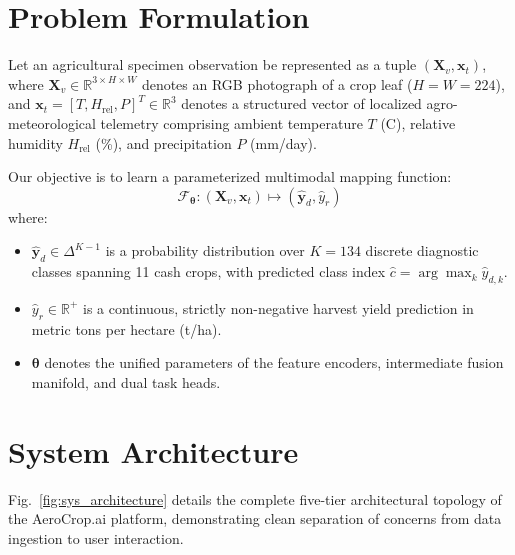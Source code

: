 \documentclass[conference]{IEEEtran}
\begin{document}
\section{Problem Formulation}

Let an agricultural specimen observation be represented as a tuple $(\mathbf{X}_v, \mathbf{x}_t)$, where $\mathbf{X}_v \in \mathbb{R}^{3 \times H \times W}$ denotes an RGB photograph of a crop leaf ($H = W = 224$), and $\mathbf{x}_t = [T, H_{\text{rel}}, P]^T \in \mathbb{R}^3$ denotes a structured vector of localized agro-meteorological telemetry comprising ambient temperature $T$ (\textdegree C), relative humidity $H_{\text{rel}}$ (\%), and precipitation $P$ (mm/day).

Our objective is to learn a parameterized multimodal mapping function:
\begin{equation}
    \mathcal{F}_{\boldsymbol{\theta}}: (\mathbf{X}_v, \mathbf{x}_t) \mapsto (\hat{\mathbf{y}}_d, \hat{y}_r)
\end{equation}
where:
\begin{itemize}
    \item $\hat{\mathbf{y}}_d \in \Delta^{K-1}$ is a probability distribution over $K = 134$ discrete diagnostic classes spanning 11 cash crops, with predicted class index $\hat{c} = \arg\max_k \hat{y}_{d,k}$.
    \item $\hat{y}_r \in \mathbb{R}^+$ is a continuous, strictly non-negative harvest yield prediction in metric tons per hectare (t/ha).
    \item $\boldsymbol{\theta}$ denotes the unified parameters of the feature encoders, intermediate fusion manifold, and dual task heads.
\end{itemize}

\section{System Architecture}

Fig.~\ref{fig:sys_architecture} details the complete five-tier architectural topology of the AeroCrop.ai platform, demonstrating clean separation of concerns from data ingestion to user interaction.
\end{document}
